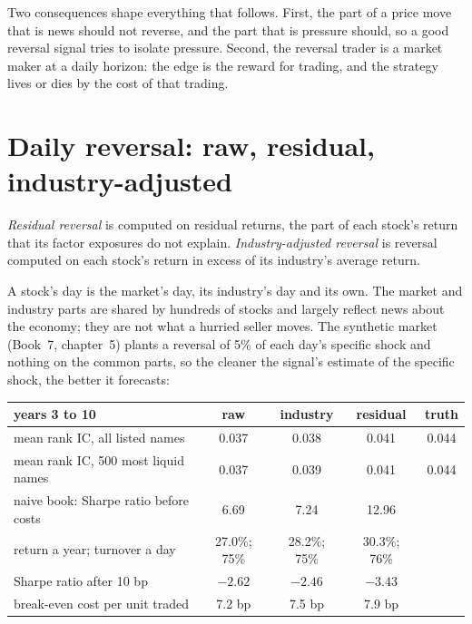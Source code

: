 Two consequences shape everything that follows. First, the part of a price move that is news should not reverse, and the part that is pressure should, so a
good reversal signal tries to isolate pressure. Second, the reversal trader is a market maker at a daily horizon: the edge is the reward for trading, and the
strategy lives or dies by the cost of that trading.

\section{Daily reversal: raw, residual, industry-adjusted}

\begin{definition}\label{def:s1:short-term-reversal:residual}
\emph{Residual reversal} is  computed on residual returns, the part of each stock's return that its factor
exposures do not explain. \emph{Industry-adjusted reversal} is reversal computed on each stock's return in excess of its
industry's average return.
\end{definition}

A stock's day is the market's day, its industry's day and its own. The market and industry parts are shared by hundreds of stocks and largely reflect news
about the economy; they are not what a hurried seller moves. The synthetic market (Book~7, chapter~5) plants a reversal of 5\% of each day's specific shock and
nothing on the common parts, so the cleaner the signal's estimate of the specific shock, the better it forecasts:

\begin{center}
\small
\begin{tabular}{@{}lcccc@{}}
\toprule
years 3 to 10 & raw & industry & residual & truth\\
\midrule
mean rank IC, all listed names & 0.037 & 0.038 & 0.041 & 0.044\\
mean rank IC, 500 most liquid names & 0.037 & 0.039 & 0.041 & 0.044\\
\midrule
naive book: Sharpe ratio before costs & 6.69 & 7.24 & 12.96 & \\
return a year; turnover a day & 27.0\%; 75\% & 28.2\%; 75\% & 30.3\%; 76\% & \\
Sharpe ratio after 10 bp & $-2.62$ & $-2.46$ & $-3.43$ & \\
break-even cost per unit traded & 7.2 bp & 7.5 bp & 7.9 bp & \\
\bottomrule
\end{tabular}
\end{center}

